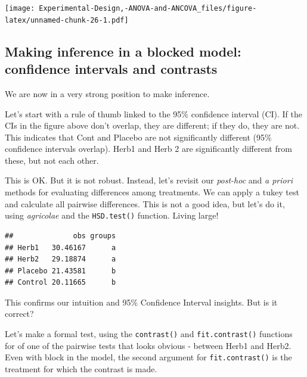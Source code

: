 \documentclass[
]{book}
\newenvironment{Shaded}{\begin{snugshade}}{\end{snugshade}}
\newcommand{\AttributeTok}[1]{\textcolor[rgb]{0.77,0.63,0.00}{#1}}
\newcommand{\CommentTok}[1]{\textcolor[rgb]{0.56,0.35,0.01}{\textit{#1}}}
\newcommand{\ConstantTok}[1]{\textcolor[rgb]{0.00,0.00,0.00}{#1}}
\newcommand{\FunctionTok}[1]{\textcolor[rgb]{0.00,0.00,0.00}{#1}}
\newcommand{\NormalTok}[1]{#1}
\newcommand{\OtherTok}[1]{\textcolor[rgb]{0.56,0.35,0.01}{#1}}
\newcommand{\SpecialCharTok}[1]{\textcolor[rgb]{0.00,0.00,0.00}{#1}}
\newcommand{\StringTok}[1]{\textcolor[rgb]{0.31,0.60,0.02}{#1}}
\begin{document}
\texttt{[image: Experimental-Design,-ANOVA-and-ANCOVA\_files/figure-latex/unnamed-chunk-26-1.pdf]}

\hypertarget{making-inference-in-a-blocked-model-confidence-intervals-and-contrasts}{%
\subsection{Making inference in a blocked model: confidence intervals and contrasts}\label{making-inference-in-a-blocked-model-confidence-intervals-and-contrasts}}

We are now in a very strong position to make inference.

Let's start with a rule of thumb linked to the 95\% confidence interval (CI). If the CIs in the figure above don't overlap, they are different; if they do, they are not. This indicates that Cont and Placebo are not significantly different (95\% confidence intervals overlap). Herb1 and Herb 2 are significantly different from these, but not each other.

This is OK. But it is not robust. Instead, let's revisit our \emph{post-hoc} and \emph{a priori} methods for evaluating differences among treatments. We can apply a tukey test and calculate all pairwise differences. This is not a good idea, but let's do it, using \emph{agricolae} and the \texttt{HSD.test()} function. Living large!

\begin{Shaded}
\end{Shaded}

\begin{verbatim}
##              obs groups
## Herb1   30.46167      a
## Herb2   29.18874      a
## Placebo 21.43581      b
## Control 20.11665      b
\end{verbatim}

This confirms our intuition and 95\% Confidence Interval insights. But is it correct?

Let's make a formal test, using the \texttt{contrast()} and \texttt{fit.contrast()} functions for of one of the pairwise tests that looks obvious - between Herb1 and Herb2. Even with block in the model, the second argument for \texttt{fit.contrast()} is the treatment for which the contrast is made.
\end{document}
